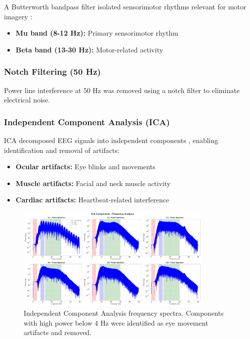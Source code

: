\documentclass[11pt]{article}
\begin{document}
A Butterworth bandpass filter isolated sensorimotor rhythms relevant for motor imagery \citep{pfurtscheller1999motor}:

\begin{itemize}
    \item \textbf{Mu band (8-12 Hz):} Primary sensorimotor rhythm
    \item \textbf{Beta band (13-30 Hz):} Motor-related activity
\end{itemize}

\subsubsection{Notch Filtering (50 Hz)}

Power line interference at 50 Hz was removed using a notch filter to eliminate electrical noise.

\subsubsection{Independent Component Analysis (ICA)}

ICA decomposed EEG signals into independent components \citep{hyvarinen2000independent,delorme2004eeglab}, enabling identification and removal of artifacts:

\begin{itemize}
    \item \textbf{Ocular artifacts:} Eye blinks and movements
    \item \textbf{Muscle artifacts:} Facial and neck muscle activity
    \item \textbf{Cardiac artifacts:} Heartbeat-related interference
\end{itemize}

\begin{figure}[H]
    \centering
    \includegraphics[width=0.85\textwidth]{../results/figures/02_ica_components_spectrum.png}
    \caption{Independent Component Analysis frequency spectra. Components with high power below 4 Hz were identified as eye movement artifacts and removed.}
    \label{fig:ica_components}
\end{figure}
\end{document}
